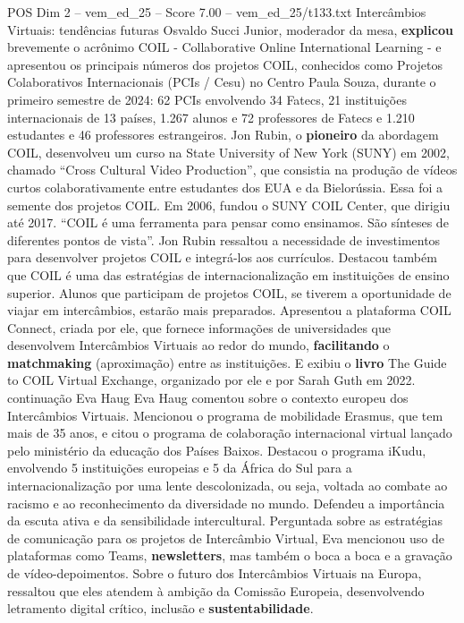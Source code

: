 \begin{textsample}{POS Dim 2 – vem\_ed\_25 – Score 7.00 – vem\_ed\_25/t133.txt}  \label{ex:f2_pos_134}
Intercâmbios Virtuais: tendências futuras Osvaldo Succi Junior, moderador da mesa, \textbf{explicou} brevemente o acrônimo COIL - Collaborative Online International Learning - e apresentou os principais números dos projetos COIL, conhecidos como Projetos Colaborativos Internacionais (PCIs / Cesu) no Centro Paula Souza, durante o primeiro semestre de 2024: 62 PCIs envolvendo 34 Fatecs, 21 instituições internacionais de 13 países, 1.267 alunos e 72 professores de Fatecs e 1.210 estudantes e 46 professores estrangeiros.
Jon Rubin, o \textbf{pioneiro} da abordagem COIL, desenvolveu um curso na State University of New York (SUNY) em 2002, chamado “Cross Cultural Video Production”, que consistia na produção de vídeos curtos colaborativamente entre estudantes dos EUA e da Bielorússia.
Essa foi a semente dos projetos COIL.
Em 2006, fundou o SUNY COIL Center, que dirigiu até 2017. “COIL é uma ferramenta para pensar como ensinamos.
São sínteses de diferentes pontos de vista”.
Jon Rubin ressaltou a necessidade de investimentos para desenvolver projetos COIL e integrá-los aos currículos.
Destacou também que COIL é uma das estratégias de internacionalização em instituições de ensino superior.
Alunos que participam de projetos COIL, se tiverem a oportunidade de viajar em intercâmbios, estarão mais preparados.
Apresentou a plataforma COIL Connect, criada por ele, que fornece informações de universidades que desenvolvem Intercâmbios Virtuais ao redor do mundo, \textbf{facilitando} o \textbf{matchmaking} (aproximação) entre as instituições.
E exibiu o \textbf{livro} The Guide to COIL Virtual Exchange, organizado por ele e por Sarah Guth em 2022. continuação Eva Haug Eva Haug comentou sobre o contexto europeu dos Intercâmbios Virtuais.
Mencionou o programa de mobilidade Erasmus, que tem mais de 35 anos, e citou o programa de colaboração internacional virtual lançado pelo ministério da educação dos Países Baixos.
Destacou o programa iKudu, envolvendo 5 instituições europeias e 5 da África do Sul para a internacionalização por uma lente descolonizada, ou seja, voltada ao combate ao racismo e ao reconhecimento da diversidade no mundo.
Defendeu a importância da escuta ativa e da sensibilidade intercultural.
Perguntada sobre as estratégias de comunicação para os projetos de Intercâmbio Virtual, Eva mencionou uso de plataformas como Teams, \textbf{newsletters}, mas também o boca a boca e a gravação de vídeo-depoimentos.
Sobre o futuro dos Intercâmbios Virtuais na Europa, ressaltou que eles atendem à ambição da Comissão Europeia, desenvolvendo letramento digital crítico, inclusão e \textbf{sustentabilidade}.

\end{textsample}
